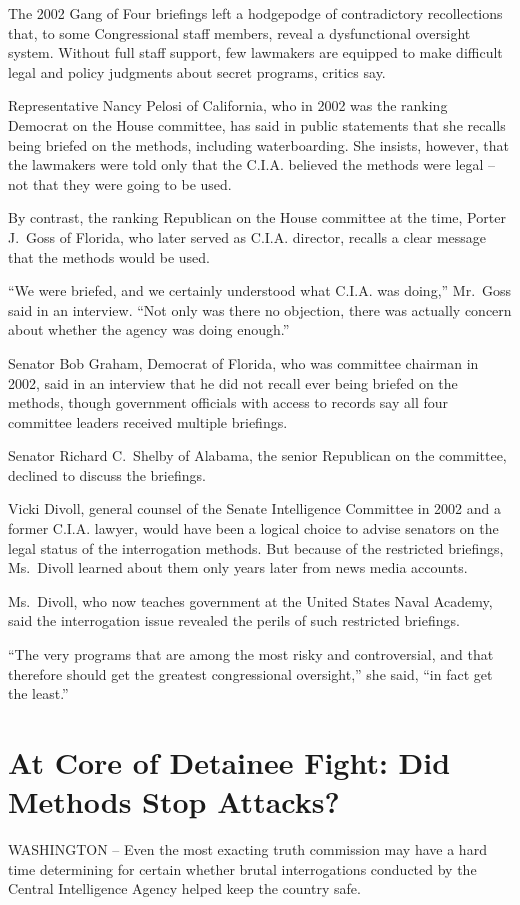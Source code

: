 \documentclass[12pt,a4paper,onecolumn]{article}
\begin{document}
The 2002 Gang of Four briefings left a hodgepodge of contradictory recollections that, to some
Congressional staff members, reveal a dysfunctional oversight system. Without full staff support,
few lawmakers are equipped to make difficult legal and policy judgments about secret programs,
critics say.

Representative Nancy Pelosi of California, who in 2002 was the ranking Democrat on the House
committee, has said in public statements that she recalls being briefed on the methods, including
waterboarding. She insists, however, that the lawmakers were told only that the C.I.A. believed the
methods were legal -- not that they were going to be used.

By contrast, the ranking Republican on the House committee at the time, Porter J.~Goss of Florida,
who later served as C.I.A. director, recalls a clear message that the methods would be used.

``We were briefed, and we certainly understood what C.I.A. was doing,'' Mr.~Goss said in an
interview. ``Not only was there no objection, there was actually concern about whether the agency
was doing enough.''

Senator Bob Graham, Democrat of Florida, who was committee chairman in 2002, said in an interview
that he did not recall ever being briefed on the methods, though government officials with access to
records say all four committee leaders received multiple briefings.

Senator Richard C.~Shelby of Alabama, the senior Republican on the committee, declined to discuss
the briefings.

Vicki Divoll, general counsel of the Senate Intelligence Committee in 2002 and a former C.I.A.
lawyer, would have been a logical choice to advise senators on the legal status of the interrogation
methods. But because of the restricted briefings, Ms.~Divoll learned about them only years later
from news media accounts.

Ms.~Divoll, who now teaches government at the United States Naval Academy, said the interrogation
issue revealed the perils of such restricted briefings.

``The very programs that are among the most risky and controversial, and that therefore should get
the greatest congressional oversight,'' she said, ``in fact get the least.''

\section{At Core of Detainee Fight: Did Methods Stop Attacks?}
WASHINGTON -- Even the most exacting truth commission may have a hard time determining for certain
whether brutal interrogations conducted by the Central Intelligence Agency helped keep the country
safe.
\end{document}
